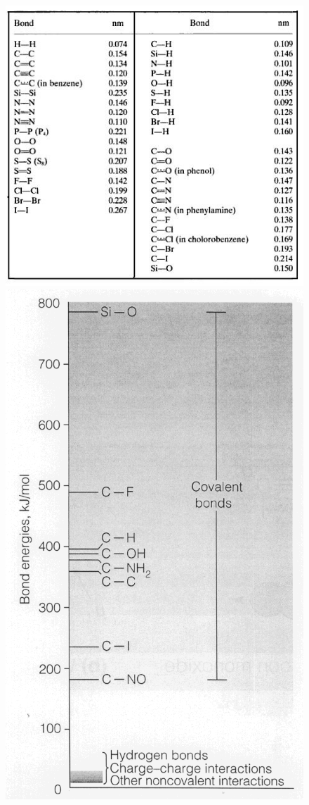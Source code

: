 \begin{figure}[h]
\centering
\includegraphics[scale=0.5]{figures/bond-energy-table.png}
\includegraphics[scale=0.3]{figures/bonde.png}

\end{figure}
